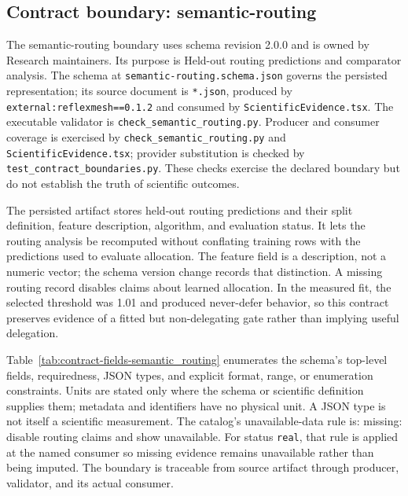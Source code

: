 \subsection{Contract boundary: semantic-routing}\label{sec:contract-semantic_routing}
The semantic-routing boundary uses schema revision 2.0.0 and is owned by Research maintainers. Its purpose is Held-out routing predictions and comparator analysis. The schema at \texttt{semantic-routing.schema.json} governs the persisted representation; its source document is \texttt{*.json}, produced by \texttt{external:reflexmesh==0.1.2} and consumed by \texttt{Scientific\allowbreak{}Evidence.tsx}. The executable validator is \texttt{check\_\allowbreak{}semantic\_\allowbreak{}routing.py}. Producer and consumer coverage is exercised by \texttt{check\_\allowbreak{}semantic\_\allowbreak{}routing.py} and \texttt{Scientific\allowbreak{}Evidence.tsx}; provider substitution is checked by \texttt{test\_\allowbreak{}contract\_\allowbreak{}boundaries.py}. These checks exercise the declared boundary but do not establish the truth of scientific outcomes.

The persisted artifact stores held-out routing predictions and their split definition, feature description, algorithm, and evaluation status. It lets the routing analysis be recomputed without conflating training rows with the predictions used to evaluate allocation. The feature field is a description, not a numeric vector; the schema version change records that distinction. A missing routing record disables claims about learned allocation. In the measured fit, the selected threshold was 1.01 and produced never-defer behavior, so this contract preserves evidence of a fitted but non-delegating gate rather than implying useful delegation.

Table~\ref{tab:contract-fields-semantic_routing} enumerates the schema's top-level fields, requiredness, JSON types, and explicit format, range, or enumeration constraints. Units are stated only where the schema or scientific definition supplies them; metadata and identifiers have no physical unit. A JSON type is not itself a scientific measurement. The catalog's unavailable-data rule is: missing: disable routing claims and show unavailable. For status \texttt{real}, that rule is applied at the named consumer so missing evidence remains unavailable rather than being imputed. The boundary is traceable from source artifact through producer, validator, and its actual consumer.

